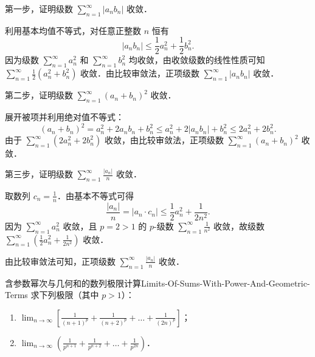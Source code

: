 \begin{myproof}
    第一步，证明级数 $\sum_{n=1}^\infty |a_n b_n|$ 收敛．

    利用基本均值不等式，对任意正整数 $n$ 恒有
    \begin{equation}
        |a_n b_n| \leqslant \frac{1}{2}a_n^2 + \frac{1}{2}b_n^2.
    \end{equation}
    因为级数 $\sum_{n=1}^\infty a_n^2$ 和 $\sum_{n=1}^\infty b_n^2$ 均收敛，由收敛级数的线性性质可知 $\sum_{n=1}^\infty \frac{1}{2}(a_n^2 + b_n^2)$ 收敛．由比较审敛法，正项级数 $\sum_{n=1}^\infty |a_n b_n|$ 收敛．

    第二步，证明级数 $\sum_{n=1}^\infty (a_n + b_n)^2$ 收敛．

    展开被项并利用绝对值不等式：
    \begin{equation}
        (a_n + b_n)^2 = a_n^2 + 2a_n b_n + b_n^2 \leqslant a_n^2 + 2|a_n b_n| + b_n^2 \leqslant 2a_n^2 + 2b_n^2.
    \end{equation}
    由于 $\sum_{n=1}^\infty (2a_n^2 + 2b_n^2)$ 收敛，由比较审敛法，正项级数 $\sum_{n=1}^\infty (a_n + b_n)^2$ 收敛．

    第三步，证明级数 $\sum_{n=1}^\infty \frac{|a_n|}{n}$ 收敛．

    取数列 $c_n = \frac{1}{n}$．由基本不等式可得
    \begin{equation}
        \frac{|a_n|}{n} = |a_n \cdot c_n| \leqslant \frac{1}{2}a_n^2 + \frac{1}{2n^2}.
    \end{equation}
    因为 $\sum_{n=1}^\infty a_n^2$ 收敛，且 $p = 2 > 1$ 的 $p$-级数 $\sum_{n=1}^\infty \frac{1}{n^2}$ 收敛，故级数 $\sum_{n=1}^\infty \left( \frac{1}{2}a_n^2 + \frac{1}{2n^2} \right)$ 收敛．

    由比较审敛法可知，正项级数 $\sum_{n=1}^\infty \frac{|a_n|}{n}$ 收敛．
\end{myproof}

\begin{problem}{含参数幂次与几何和的数列极限计算}{Limits-Of-Sums-With-Power-And-Geometric-Terms}
    求下列极限（其中 $p > 1$）：
    \begin{enumerate}
        \item $\lim_{n\to\infty} \left[ \frac{1}{(n+1)^p} + \frac{1}{(n+2)^p} + \dots + \frac{1}{(2n)^p} \right]$；
        \item $\lim_{n\to\infty} \left( \frac{1}{p^{n+1}} + \frac{1}{p^{n+2}} + \dots + \frac{1}{p^{2n}} \right)$．
    \end{enumerate}
\end{problem}


